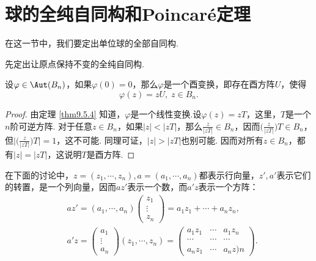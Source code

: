 \section{球的全纯自同构和Poincar\'e定理\label{sec9.6}}
在这一节中，我们要定出单位球的全部自同构.

先定出让原点保持不变的全纯自同构.
\begin{theorem}\label{thm9.6.1}
设$\varphi\in\Aut(B_n)$，如果$\varphi(0)=0$，那么$\varphi$是一个酉变换，即存在酉方阵$U$，使得
\[\varphi(z)=zU,\;z\in B_n.\]
\end{theorem}
\begin{proof}
由定理 \ref{thm9.5.4} 知道，$\varphi$是一个线性变换.设$\varphi(z)=zT$，这里，$T$是一个$n$阶可逆方阵. 对于任意$z\in B_n$，如果$|z|<|zT|$，那么$\frac z{|zT|}\in B_n$，因而$\bigg(\frac z{|zT|}\bigg)T\in B_n$，但$\bigg|\bigg(\frac z{|zT|}\bigg)T\bigg|=1$，这不可能. 同理可证，$|z|>|zT|$也别可能. 因而对所有$z\in B_n$，都有$|z|=|zT|$，这说明$T$是酉方阵.
\end{proof}

在下面的讨论中，$z=(z_1,\cdots,z_n),a=(a_1,\cdots,a_n)$都表示行向量，$z',a'$表示它们的转置，是一个列向量，因而$az'$表示一个数，而$a'z$表示一个方阵：
\begin{align*}
&az'=(a_1,\cdots,a_n)\begin{pmatrix}
z_1\\\vdots\\z_n
\end{pmatrix}=a_1z_1+\cdots+a_nz_n,\\
&a'z=\begin{pmatrix}
a_1\\\vdots\\a_n
\end{pmatrix}(z_1,\cdots,z_n)=\begin{pmatrix}
a_1z_1&\cdots&a_1z_n\\
\cdots&\cdots&\cdots\\
a_nz_1&\cdots&a_nz)n
\end{pmatrix}.
\end{align*}

